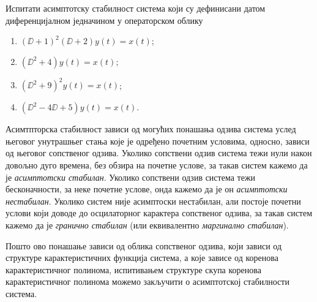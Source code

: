 \PID \mnImportant \label{z:ct_stab}
Испитати асимптотску стабилност система који су дефинисани датом диференцијалном једначином у операторском облику
\begin{multicols}{2}
    \begin{enumerate}[label=(\alph*)]
    \item $(\DD + 1)^2(\DD + 2)y(t) = x(t)$;
    \item $(\DD^2 + 4)y(t) = x(t)$;
    \item $(\DD^2 + 9)^2 y(t) = x(t)$;
    \item $(\DD^2 - 4\DD + 5) y(t) = x(t)$.
    \end{enumerate}
\end{multicols} \noindent

\RESENJE
Асимтпторска стабилност зависи од могућих понашања одзива система услед његовог унутрашњег стања које је одређено почетним условима, односно, 
зависи од његовог сопственог одзива. Уколико сопствени одзив система тежи нули након довољно дуго времена, без обзира на почетне услове, 
за такав систем кажемо да је \textit{асимптотски стабилан}. Уколико сопствени одзив система тежи бесконачности, за неке почетне услове, онда кажемо 
да је он \textit{асимптотски нестабилан}. Уколико систем није асимптоски нестабилан, али постоје почетни услови који доводе до осцилаторног карактера 
сопственог одзива, за такав систем кажемо да је \textit{гранично стабилан} (или еквивалентно \textit{маргинално стабилан}).

Пошто ово понашање зависи од облика сопственог одзива, који зависи од структуре карактеристичних функција система, а које зависе од коренова карактеристичног
полинома, испитивањем структуре скупа коренова карактеристичног полинома можемо закључити о асимптотској стабилности система. 

